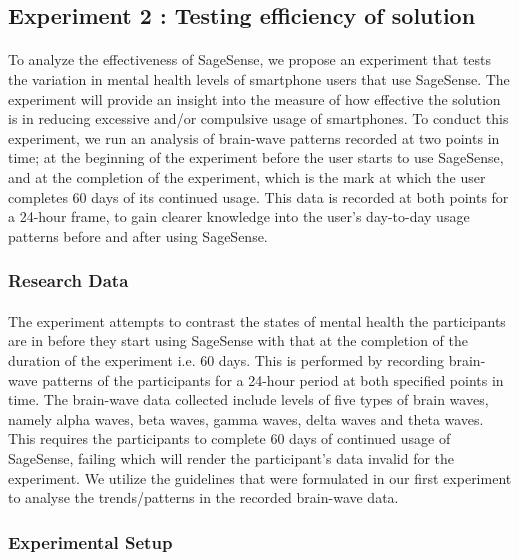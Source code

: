 \documentclass{article}
\begin{document}
\subsection{Experiment 2 : Testing efficiency of solution}

\paragraph{} To analyze the effectiveness of SageSense, we propose an experiment that tests the variation in mental health levels of smartphone users that use SageSense. The experiment will provide an insight into the measure of how effective the solution is in reducing excessive and/or compulsive usage of smartphones. To conduct this experiment, we run an analysis of brain-wave patterns recorded at two points in time; at the beginning of the experiment before the user starts to use SageSense, and at the completion of the experiment, which is the mark at which the user completes 60 days of its continued usage. This data is recorded at both points for a 24-hour frame, to gain clearer knowledge into the user's day-to-day usage patterns before and after using SageSense.


\subsubsection{Research Data}

\paragraph{} The experiment attempts to contrast the states of mental health the participants are in before they start using SageSense with that at the completion of the duration of the experiment i.e. 60 days. This is performed by recording brain-wave patterns of the participants for a 24-hour period at both specified points in time. The brain-wave data collected include levels of five types of brain waves, namely alpha waves, beta waves, gamma waves, delta waves and theta waves. This requires the participants to complete 60 days of continued usage of SageSense, failing which will render the participant's data invalid for the experiment. We utilize the guidelines that were formulated in our first experiment to analyse the trends/patterns in the recorded brain-wave data.

\subsubsection{Experimental Setup}
\end{document}
